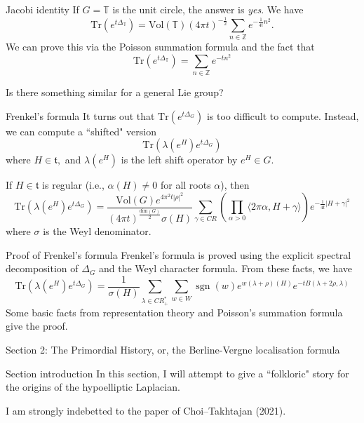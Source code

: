 \documentclass{beamer}
\numberwithin{equation}{section}
\theoremstyle{plain}
\theoremstyle{plain}
\theoremstyle{definition}
\theoremstyle{plain}
\theoremstyle{plain}
\theoremstyle{definition}
\newcommand{\Itgr}{\mathbb{Z}}
\newcommand{\Circ}{\mathbb{T}}
\newcommand{\Tr}{\mathrm{Tr}}
\newcommand{\sgn}{\operatorname{sgn}}
\newcommand{\tf}{\mathfrak{t}}
\begin{document}
\begin{frame}{Jacobi identity}
  If $G = \Circ$ is the unit circle, the answer is \emph{yes}. We have
  \[
    \Tr(e^{t\Delta_{\Circ}}) = \mathrm{Vol}(\Circ)(4\pi t)^{-\frac12}\sum_{n\in \Itgr} e^{-\frac{1}{4t}n^2}.
  \]
  We can prove this via the Poisson summation formula and the fact that
  \[
    \Tr(e^{t\Delta_{\Circ}}) = \sum_{n\in \Itgr} e^{-tn^2}
  \]
  
  
  Is there something similar for a general Lie group?
\end{frame}

\begin{frame}{Frenkel's formula}
  It turns out that $\Tr(e^{t\Delta_G})$ is too difficult to compute. Instead, we can compute a ``shifted" version
  \[
    \Tr(\lambda(e^H)e^{t\Delta_G})
  \]
  where $H\in \tf,$ and $\lambda(e^H)$ is the left shift operator by $e^H\in G.$
  \begin{theorem}[Frenkel (1984)]
      If $H\in \tf$ is regular (i.e., $\alpha(H)\neq 0$ for all roots $\alpha$), then
      \[
          \Tr(\lambda(e^H)e^{t\Delta_G}) = \frac{\mathrm{Vol}(G)e^{4\pi^2t|\rho|^2}}{(4\pi t)^{\frac{\mathrm{dim}(G)}{2}}\sigma(H)}\sum_{\gamma \in CR} \left(\prod_{\alpha>0} \langle 2\pi \alpha,H+\gamma\rangle\right) e^{-\frac{1}{4t}|H+\gamma|^2} 
      \]
      where $\sigma$ is the Weyl denominator.
  \end{theorem}
\end{frame}

\begin{frame}{Proof of Frenkel's formula}
    Frenkel's formula is proved using the explicit spectral decomposition of $\Delta_G$ and the Weyl character formula. From these facts, we have
    \[
      \Tr(\lambda(e^H)e^{t\Delta_G}) = \frac{1}{\sigma(H)}\sum_{\lambda \in CR^*_+} \sum_{w \in W} \sgn(w)e^{w(\lambda+\rho)(H)}e^{-tB(\lambda+2\rho,\lambda)}
    \]
    Some basic facts from representation theory and Poisson's summation formula give the proof.
\end{frame}


\begin{frame}
    \huge{Section 2: The Primordial History, or, the Berline-Vergne localisation formula}
\end{frame}

\begin{frame}{Section introduction}
  In this section, I will attempt to give a ``folkloric" story for the origins of the hypoelliptic Laplacian.
  
  I am strongly indebetted to the paper of Choi--Takhtajan (2021).
\end{frame}
\end{document}
